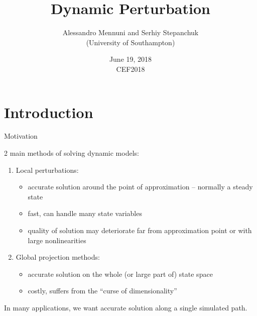 \documentclass{beamer}
\title [Dynamic Perturbation] {Dynamic Perturbation}
\author[Mennuni and Stepanchuk]{Alessandro Mennuni and Serhiy Stepanchuk \\ (University of Southampton)}
\date[June 19, 2018]{June 19, 2018 \\ CEF2018}
\begin{document}
\begin{frame}
\titlepage
\end{frame}

\section{Introduction}

\begin{frame}{Motivation}

    2 main methods of solving dynamic models:

    \medskip
    \begin{enumerate}
        \item Local perturbations:
            \begin{itemize}
                \item accurate solution around the point of approximation -- normally a steady state
                \item fast, can handle many state variables
                \item quality of solution may deteriorate far from approximation point or 
                    with large nonlinearities
            \end{itemize}
        \item Global projection methods:
            \begin{itemize}
                \item accurate solution on the whole (or large part of) state space
                \item costly, suffers from the ``curse of dimensionality''
            \end{itemize}
    \end{enumerate}

    \bigskip
    In many applications, we want accurate solution along a single simulated path.

\end{frame}
\end{document}
